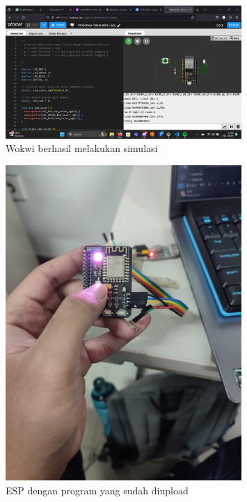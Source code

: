\begin{figure}[H]
  \centering
  \includegraphics[width=0.8\textwidth]{img/wokwi-simulation.png}
  \caption{Wokwi berhasil melakukan simulasi}
  \label{fig:wokwi-simulasi}
\end{figure}

\begin{figure}[H]
  \centering
  \includegraphics[width=0.8\textwidth]{img/esp-jadi.jpeg}
  \caption{ESP dengan program yang sudah diupload}
  \label{fig:ESP-jadi}
\end{figure}